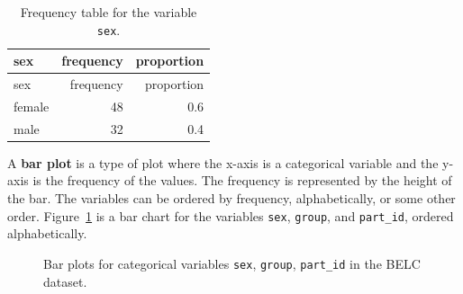 \documentclass[
  letterpaper,
  DIV=11,
  numbers=noendperiod]{scrreport}
\theoremstyle{definition}
\theoremstyle{remark}
\begin{document}
\hypertarget{tbl-aa-belc-frequency-table}{}
\begin{longtable}[]{@{}lrr@{}}
\caption{\label{tbl-aa-belc-frequency-table}Frequency table for the
variable \texttt{sex}.}\tabularnewline
\toprule\noalign{}
sex & frequency & proportion \\
\midrule\noalign{}
\endfirsthead
\toprule\noalign{}
sex & frequency & proportion \\
\midrule\noalign{}
\endhead
\bottomrule\noalign{}
\endlastfoot
female & 48 & 0.6 \\
male & 32 & 0.4 \\
\end{longtable}

A \textbf{bar plot} is a type of plot where the x-axis is a categorical
variable and the y-axis is the frequency of the values. The frequency is
represented by the height of the bar. The variables can be ordered by
frequency, alphabetically, or some other order.
Figure~\ref{fig-aa-belc-barplots} is a bar chart for the variables
\texttt{sex}, \texttt{group}, and \texttt{part\_id}, ordered
alphabetically.

\begin{figure}

\begin{minipage}[t]{0.33\linewidth}

{\centering 


}

\end{minipage}%
%
\begin{minipage}[t]{0.33\linewidth}

{\centering 


}

\end{minipage}%
%
\begin{minipage}[t]{0.33\linewidth}

{\centering 


}

\end{minipage}%

\caption{\label{fig-aa-belc-barplots}Bar plots for categorical variables
\texttt{sex}, \texttt{group}, \texttt{part\_id} in the BELC dataset.}

\end{figure}
\end{document}

